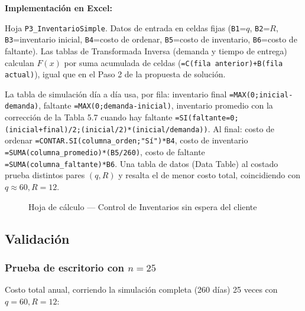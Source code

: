 \textbf{Implementación en Excel:}

Hoja \texttt{P3\_InventarioSimple}. Datos de entrada en celdas fijas (\texttt{B1}=$q$, \texttt{B2}=$R$, \texttt{B3}=inventario inicial, \texttt{B4}=costo de ordenar, \texttt{B5}=costo de inventario, \texttt{B6}=costo de faltante). Las tablas de Transformada Inversa (demanda y tiempo de entrega) calculan $F(x)$ por suma acumulada de celdas (\texttt{=C(fila anterior)+B(fila actual)}), igual que en el Paso 2 de la propuesta de solución.

La tabla de simulación día a día usa, por fila: inventario final \texttt{=MAX(0;inicial-demanda)}, faltante \texttt{=MAX(0;demanda-inicial)}, inventario promedio con la corrección de la Tabla 5.7 cuando hay faltante \texttt{=SI(faltante=0;(inicial+final)/2;(inicial/2)*(inicial/demanda))}. Al final: costo de ordenar \texttt{=CONTAR.SI(columna\_orden;"Sí")*B4}, costo de inventario \texttt{=SUMA(columna\_promedio)*(B5/260)}, costo de faltante \texttt{=SUMA(columna\_faltante)*B6}. Una tabla de datos (Data Table) al costado prueba distintos pares $(q,R)$ y resalta el de menor costo total, coincidiendo con $q\approx60, R=12$.

\begin{figure}[H]
\centering
{}
\caption{Hoja de cálculo — Control de Inventarios sin espera del cliente}
\end{figure}

\subsection{Validación}

\subsubsection{\texorpdfstring{Prueba de escritorio con $n=25$}{Prueba de escritorio con n=25}}

Costo total anual, corriendo la simulación completa (260 días) 25 veces con $q=60,R=12$:

